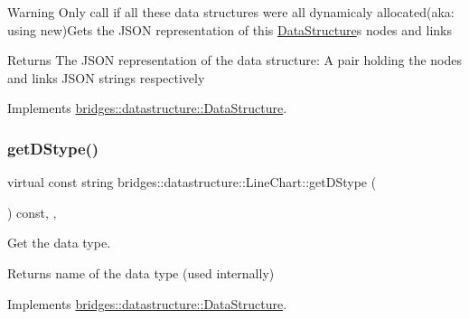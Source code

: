 \begin{DoxyWarning}{Warning}
Only call if all these data structures were all dynamicaly allocated(aka\+: using new)Gets the J\+S\+ON representation of this \mbox{\hyperlink{classbridges_1_1datastructure_1_1_data_structure}{Data\+Structure}}\textquotesingle{}s nodes and links
\end{DoxyWarning}
\begin{DoxyReturn}{Returns}
The J\+S\+ON representation of the data structure\+: A pair holding the nodes and links J\+S\+ON strings respectively 
\end{DoxyReturn}


Implements \mbox{\hyperlink{classbridges_1_1datastructure_1_1_data_structure}{bridges\+::datastructure\+::\+Data\+Structure}}.

\mbox{\label{classbridges_1_1datastructure_1_1_line_chart_a431e49c31cdd5f46e978742776306dfa}} 
\subsubsection{\texorpdfstring{getDStype()}{getDStype()}}
{\footnotesize\ttfamily virtual const string bridges\+::datastructure\+::\+Line\+Chart\+::get\+D\+Stype (\begin{DoxyParamCaption}{ }\end{DoxyParamCaption}) const\hspace{0.3cm}{\ttfamily [inline]}, {\ttfamily [override]}, {\ttfamily [virtual]}}



Get the data type. 

\begin{DoxyReturn}{Returns}
name of the data type (used internally) 
\end{DoxyReturn}


Implements \mbox{\hyperlink{classbridges_1_1datastructure_1_1_data_structure_a4ff66cb34409f11fe9fc647f6d8a22ce}{bridges\+::datastructure\+::\+Data\+Structure}}.

\mbox{\label{classbridges_1_1datastructure_1_1_line_chart_a07a4424d4bbc1cdd15cef3e2c0f0c075}} 
